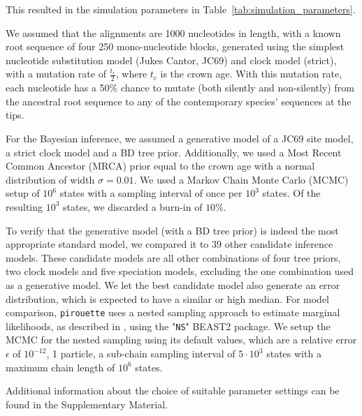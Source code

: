 This resulted in the simulation parameters in Table~\ref{tab:simulation_parameters}.



We assumed that the alignments are 1000 nucleotides in length, with a known root sequence of four 250 mono-nucleotide blocks, generated using the simplest nucleotide substitution model (Jukes Cantor, JC69) and clock model (strict), with a mutation rate of $\frac{t_c}{2}$, where $t_c$ is the crown age. 
With this mutation rate, each nucleotide has a 50\% chance to mutate (both silently and non-silently) from the ancestral root sequence to any of the contemporary species' sequences at the tips.

For the Bayesian inference, we assumed a generative model of a JC69 site model, a strict clock model and a BD tree prior.
Additionally, we used a Most Recent Common Ancestor (MRCA) prior equal to the crown age with a normal distribution of width $\sigma = 0.01$. We used a Markov Chain Monte Carlo (MCMC) setup of $10^6$ states with a sampling interval of once per $10^3$ states. Of the resulting $10^3$ states, we discarded a burn-in of $10\%$.

To verify that the generative model (with a BD tree prior) is indeed the most appropriate standard model, we compared it to 39 other candidate inference models.
These candidate models are all other combinations of four tree priors, two clock models and five speciation models, excluding the one combination used as a generative model.
We let the best candidate model also generate an error distribution, which is expected to have a similar or high median. 
For model comparison, \verb;pirouette; uses a nested sampling approach to estimate marginal likelihoods, as described in \citet{russel2019model}, using the "\verb;NS;" BEAST2 package. We setup the MCMC for the nested sampling using its default values, which are a relative error $\epsilon$ of $10^{-12}$, 
1 particle, a sub-chain sampling interval of $5 \cdot 10^3$ states with a maximum chain length of $10^6$ states.

Additional information about the choice of suitable parameter settings can be found in the Supplementary Material.
\iffalse
\giovanni{This could be put in the appendix, if we manage to put in a handy format.}
We searched through parameter space until these criteria were met.
All the parameter settings used in the pilot experiments can be found at 
\url{https://github.com/richelbilderbeek/razzo_project/blob/master/overview.md}.
Due to the low number of replicates, we were unable (nor tried)
to draw conclusions based on the results.
\fi
